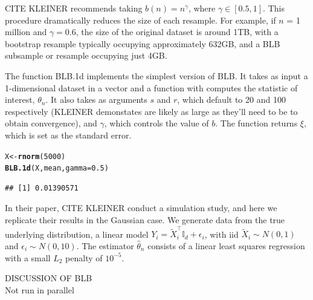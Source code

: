 \documentclass{article}\usepackage[]{graphicx}\usepackage[]{color}
\makeatletter
\newcommand{\hlnum}[1]{\textcolor[rgb]{0.686,0.059,0.569}{#1}}%
\newcommand{\hlstd}[1]{\textcolor[rgb]{0.345,0.345,0.345}{#1}}%
\newcommand{\hlkwb}[1]{\textcolor[rgb]{0.69,0.353,0.396}{#1}}%
\newcommand{\hlkwc}[1]{\textcolor[rgb]{0.333,0.667,0.333}{#1}}%
\newcommand{\hlkwd}[1]{\textcolor[rgb]{0.737,0.353,0.396}{\textbf{#1}}}%
\newenvironment{kframe}{%
 \def\at@end@of@kframe{}%
 \ifinner\ifhmode%
  \def\at@end@of@kframe{\end{minipage}}%
  \begin{minipage}{\columnwidth}%
 \fi\fi%
 \def\FrameCommand##1{\hskip\@totalleftmargin \hskip-\fboxsep
 \colorbox{shadecolor}{##1}\hskip-\fboxsep
     \hskip-\linewidth \hskip-\@totalleftmargin \hskip\columnwidth}%
 \MakeFramed {\advance\hsize-\width
   \@totalleftmargin\z@ \linewidth\hsize
   \@setminipage}}%
 {\par\unskip\endMakeFramed%
 \at@end@of@kframe}
\newenvironment{knitrout}{}{} %
\makeatother
\begin{document}


CITE KLEINER recommends taking $b(n) = n^{\gamma}$, where $\gamma \in [0.5,1]$. This procedure dramatically reduces the size of each resample. For example, if $n$ = 1 million and $\gamma=0.6$, the size of the original dataset is around 1TB, with a bootstrap resample typically occupying approximately 632GB, and a BLB subsample or resample occupying just 4GB.


The function BLB.1d implements the simplest version of BLB. It takes as input a 1-dimensional dataset in a vector and a function with computes the statistic of interest, $\theta_n$. It also takes as arguments $s$ and $r$, which default to 20 and 100 respectively (KLEINER demonstates are likely as large as they'll need to be to obtain convergence), and $\gamma$, which controls the value of $b$. The function returns $\xi$, which is set as the standard error.

\begin{knitrout}
\color{fgcolor}\begin{kframe}
\begin{alltt}
\hlstd{X} \hlkwb{<-} \hlkwd{rnorm}\hlstd{(}\hlnum{5000}\hlstd{)}
\hlkwd{BLB.1d}\hlstd{(X, mean,} \hlkwc{gamma}\hlstd{=}\hlnum{0.5}\hlstd{)}
\end{alltt}
\begin{verbatim}
## [1] 0.01390571
\end{verbatim}
\end{kframe}
\end{knitrout}

In their paper, CITE KLEINER conduct a simulation study, and here we replicate their results in the Gaussian case. We generate data from the true underlying distribution, a linear model $Y_i = \tilde X_i^{\top}\mathbb{I}_d + \epsilon_i$, with iid $\tilde X_i \sim N(0,1)$ and $\epsilon_i \sim N(0,10)$. The estimator $\hat\theta_n$ consists of a linear least squares regression with a small $L_2$ penalty of $10^{-5}$.

DISCUSSION OF BLB\\
Not run in parallel

\printbibliography
\end{document}

